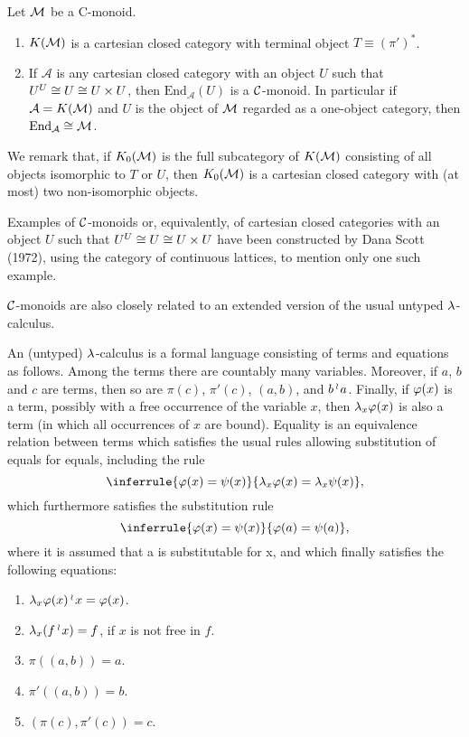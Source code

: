 \begin{thm}
Let ${\mathcal M}$ be a C-monoid.
\begin{enumerate}[label=(\roman*)]
\item $K({\mathcal M})$ is a cartesian closed category  with terminal object
$T \equiv (\pi')^*$.
\item If $\mathcal A$ is any cartesian closed category with an object $U$
such that $U^{U} \cong U \cong U \times U$, then $\text{End}_{\mathcal A}(U)$
is a $\mathcal C$-monoid. In particular if ${\mathcal A} = K({\mathcal M})$
and $U$ is the object of ${\mathcal M}$
regarded as a one-object category, then $\text{End}_{\mathcal A} \cong {\mathcal M}$.
\end{enumerate}
\end{thm}

We remark that, if $K_0({\mathcal M})$ is the full subcategory of $K({\mathcal M})$ consisting
of all objects isomorphic to $T$ or $U$, then $K_0({\mathcal M})$ is a cartesian closed
category with (at most) two non-isomorphic objects.

Examples of $\mathcal C$-monoids or, equivalently, of cartesian closed categories
with an object $U$ such that $U^{U} \cong U \cong U \times U$
have been constructed by Dana Scott (1972), using the category of continuous
lattices, to mention only one such example.

$\mathcal C$-monoids are also closely related to an extended version of the usual
untyped $\lambda$-calculus.

\begin{defn}
An (untyped) $\lambda$-calculus is a formal language consisting
of terms and equations as follows. Among the terms there are countably many
variables. Moreover, if $a$, $b$ and $c$ are terms, then so are
$\pi(c)$, $\pi'(c)$, $(a,b)$, and $b \mathop{{}^\wr}\kern-.8pt a$.
Finally, if $\varphi(x)$ is a term, possibly with a free occurrence
of the variable $x$, then $\lambda_x\varphi(x)$ is also a term (in which all occurrences of
$x$ are bound). Equality is an equivalence relation between terms which
satisfies the usual rules allowing substitution of equals for equals, including
the rule
\[
\inferrule{\pf(x) = \psi(x)}{\lx \pf(x) = \lx \psi(x)},
\]
which furthermore satisfies the substitution rule
\[
\inferrule{\pf(x) = \psi(x)}{ \pf(a) = \psi(a)},
\]
where it is assumed that a is substitutable for x, and which finally
satisfies the following equations:
\begin{enumerate}[label=L\theenumi.]
\item $\lambda_x \varphi(x)\mathop{{}^\wr}\kern-.8pt x = \varphi(x)$.
\item $\lambda_x (f \mathop{{}^\wr}\kern-.8pt x) = f$, if $x$ is not free in $f$.
\item $\pi((a,b)) = a$.
\item $\pi'((a,b)) = b$.
\item $(\pi(c), \pi' (c)) = c$.
\end{enumerate}
\end{defn}

